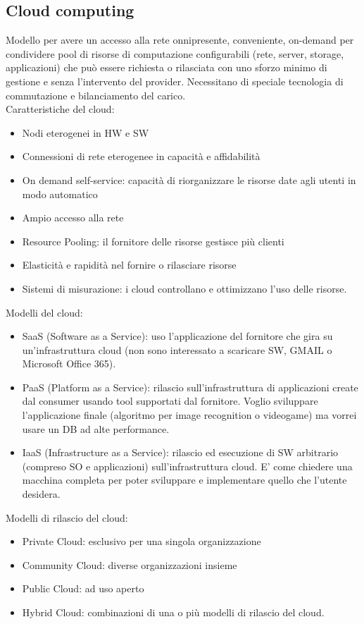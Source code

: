 \documentclass[12pt,italian]{report}
\begin{document}
\subsection{Cloud computing}
\label{sec: cloud}
Modello per avere un accesso alla rete onnipresente, conveniente, on-demand per condividere pool di risorse di computazione configurabili (rete, server, storage, applicazioni) che può essere richiesta o rilasciata con uno sforzo minimo di gestione e senza l'intervento del provider. Necessitano di speciale tecnologia di commutazione e bilanciamento del carico. \\ Caratteristiche del cloud:
\begin{itemize}
    \item Nodi eterogenei in HW e SW
    \item Connessioni di rete eterogenee in capacità e affidabilità
    \item On demand self-service: capacità di riorganizzare le risorse date agli utenti in modo automatico
    \item Ampio accesso alla rete
    \item Resource Pooling: il fornitore delle risorse gestisce più clienti
    \item Elasticità e rapidità nel fornire o rilasciare risorse
    \item Sistemi di misurazione: i cloud controllano e ottimizzano l'uso delle risorse. 
\end{itemize} 
\noindent Modelli del cloud:
\begin{itemize}
    \item SaaS (Software as a Service): uso l'applicazione del fornitore che gira su un'infrastruttura cloud (non sono interessato a scaricare SW, GMAIL o Microsoft Office 365). 
    \item PaaS (Platform as a Service): rilascio sull'infrastruttura di applicazioni create dal consumer usando tool supportati dal fornitore. Voglio sviluppare l'applicazione finale (algoritmo per image recognition o videogame) ma vorrei usare un DB ad alte  performance.
    \item IaaS (Infrastructure as a Service): rilascio ed esecuzione di SW arbitrario (compreso SO e applicazioni) sull'infrastruttura cloud. E' come chiedere una macchina completa per poter sviluppare e implementare quello che l'utente desidera. 
\end{itemize}
\bigbreak
\noindent Modelli di rilascio del cloud:
\begin{itemize}
    \item Private Cloud: esclusivo per una singola organizzazione 
    \item Community Cloud: diverse organizzazioni insieme
    \item Public Cloud: ad uso aperto
    \item Hybrid Cloud: combinazioni di una o più modelli di rilascio del cloud. 
\end{itemize}
\end{document}

